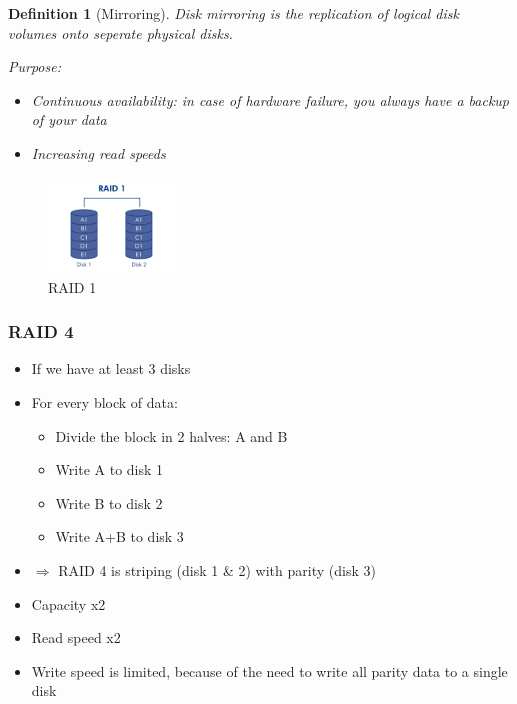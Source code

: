 \documentclass{article}
\newtheorem{theorem}{Definition}[section]
\begin{document}
\begin{theorem}[Mirroring]
    Disk mirroring is the replication of logical disk volumes onto seperate physical disks.

    Purpose:

    \begin{itemize}
        \item Continuous availability: in case of hardware failure, you always have a backup of your data
        \item Increasing read speeds
    \end{itemize}
\end{theorem}

\begin{figure}[H]
    \centering
    \includegraphics[width=0.3\textwidth]{raid-mirroring.png}
    \caption{RAID 1}
\end{figure}


\subsubsection{RAID 4}

\begin{itemize}
    \item If we have at least 3 disks
    \item For every block of data:
    \begin{itemize}
        \item Divide the block in 2 halves: A and B
        \item Write A to disk 1
        \item Write B to disk 2
        \item Write A+B to disk 3
    \end{itemize}
    \item $\Rightarrow$ RAID 4 is striping (disk 1 \& 2) with parity (disk 3)
    \item Capacity x2
    \item Read speed x2
    \item Write speed is limited, because of the need to write all parity data to a single disk
\end{itemize}
\end{document}
